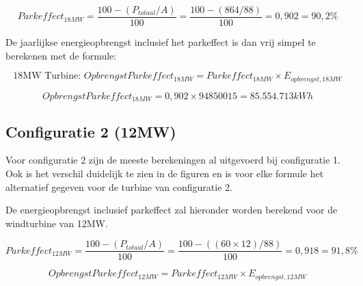 \begin{equation} \label{eq:12}
 Parkeffect_{18MW} = \frac{100-(P_{totaal}/A)}{100} = \frac{100-(864/88)}{100} = 0,902 = 90,2\%
\end{equation}

De jaarlijkse energieopbrengst inclusief het parkeffect is dan vrij simpel te berekenen met de formule: 


\begin{equation} \label{13}
\text{18MW Turbine: } OpbrengstParkeffect_{18MW}=Parkeffect_{18MW}\times E_{opbrengst,18MW} 
\end{equation}

\begin{equation} \label{14}
OpbrengstParkeffect_{18MW}=0,902\times 94850015 = 85.554.713kWh 
\end{equation}

\subsection{Configuratie 2 (12MW)}
Voor configuratie 2 zijn de meeste berekeningen al uitgevoerd bij configuratie 1. Ook is het verschil duidelijk te zien in de figuren en is voor elke formule het alternatief gegeven voor de turbine van configuratie 2. 

De energieopbrengst inclusief parkeffect zal hieronder worden berekend voor de windturbine van 12MW. 

\begin{equation} \label{eq:15}
 Parkeffect_{12MW} = \frac{100-(P_{totaal}/A)}{100} = \frac{100-((60\times 12)/88)}{100} = 0,918 = 91,8\%
\end{equation}

\begin{equation} \label{eq:16}
OpbrengstParkeffect_{12MW}=Parkeffect_{12MW}\times E_{opbrengst,12MW}
\end{equation}

